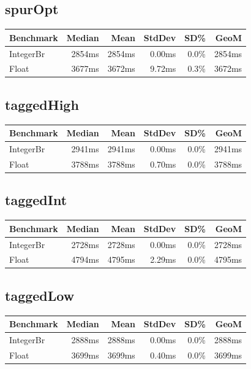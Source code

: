 {\subsection*{spurOpt}
\begin{tabular}{|l|r|r|r|r|r|}
\hline
\textbf{Benchmark} & \textbf{Median} & \textbf{Mean} & \textbf{StdDev} & \textbf{SD\%} & \textbf{GeoM} \\ \hline
IntegerBr & 2854ms & 2854ms & 0.00ms & 0.0\% & 2854ms \\ \hline
Float & 3677ms & 3672ms & 9.72ms & 0.3\% & 3672ms \\ \hline
\end{tabular}

\subsection*{taggedHigh}
\begin{tabular}{|l|r|r|r|r|r|}
\hline
\textbf{Benchmark} & \textbf{Median} & \textbf{Mean} & \textbf{StdDev} & \textbf{SD\%} & \textbf{GeoM} \\ \hline
IntegerBr & 2941ms & 2941ms & 0.00ms & 0.0\% & 2941ms \\ \hline
Float & 3788ms & 3788ms & 0.70ms & 0.0\% & 3788ms \\ \hline
\end{tabular}

\subsection*{taggedInt}
\begin{tabular}{|l|r|r|r|r|r|}
\hline
\textbf{Benchmark} & \textbf{Median} & \textbf{Mean} & \textbf{StdDev} & \textbf{SD\%} & \textbf{GeoM} \\ \hline
IntegerBr & 2728ms & 2728ms & 0.00ms & 0.0\% & 2728ms \\ \hline
Float & 4794ms & 4795ms & 2.29ms & 0.0\% & 4795ms \\ \hline
\end{tabular}

\subsection*{taggedLow}
\begin{tabular}{|l|r|r|r|r|r|}
\hline
\textbf{Benchmark} & \textbf{Median} & \textbf{Mean} & \textbf{StdDev} & \textbf{SD\%} & \textbf{GeoM} \\ \hline
IntegerBr & 2888ms & 2888ms & 0.00ms & 0.0\% & 2888ms \\ \hline
Float & 3699ms & 3699ms & 0.40ms & 0.0\% & 3699ms \\ \hline
\end{tabular}

}
